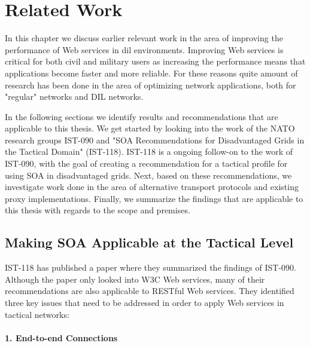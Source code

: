 \chapter{Related Work}
\label{chapter:related-work}


In this chapter we discuss earlier relevant work in the area of improving the
performance of Web services in \gls{dil} environments. Improving Web services
is critical for both civil and military users as increasing the performance
means that applications become faster and more reliable. For these reasons
quite amount of research has been done in the area of optimizing network
applications, both for "regular" networks and DIL networks.

In the following sections we identify results and recommendations that are
applicable to this thesis. We get started by looking into the work of the NATO
research groups IST-090 and "SOA Recommendations for Disadvantaged Grids in
the Tactical Domain" (IST-118). IST-118 is a ongoing follow-on to the work of
IST-090, with the goal of creating a recommendation for a tactical profile for
using SOA in disadvantaged grids. Next, based on these recommendations, we
investigate work done in the area of alternative transport protocols and
existing proxy implementations.  Finally, we summarize the findings that are
applicable to this thesis with regards to the scope and premises.

\section{Making SOA Applicable at the Tactical Level}

IST-118 has published a paper\cite{ist-118} where they summarized the findings
of IST-090. Although the paper only looked into W3C Web services, many of their
recommendations are also applicable to RESTful Web services. They identified
three key issues that need to be addressed in order to apply Web services in
tactical networks:

\label{section:DIL-problems}

\subsubsection{1. End-to-end Connections}


